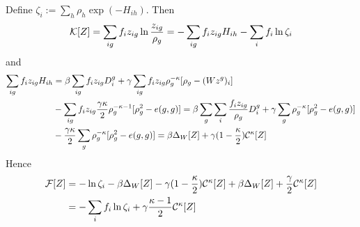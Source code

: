 \documentclass[11pt]{paper}
\begin{document}
Define $\zeta_i:=\sum_h \rho_h \exp(- H_{ih})$. Then 
\begin{equation}
\label{ }
{\cal K}[Z]=\sum_{ig}f_i z_{ig}\ln \frac{z_{ig}}{\rho_g}=-\sum_{ig}f_i z_{ig} H_{ih}-\sum_i f_i\ln \zeta_i
\end{equation}
and
\begin{align}
\label{ }
\sum_{ig}f_i z_{ig} H_{ih}& =\beta\sum_{ig}f_i z_{ig}D_i^g +\gamma\sum_{ig}f_i z_{ig} \rho_g^{-\kappa} [\rho_g-(Wz^g)_i] \notag \\
 & -\sum_{ig}f_i z_{ig}\frac{\gamma\kappa}{2} \rho_g^{-\kappa-1}[\rho_g^2-e(g,g)]=
 \beta\sum_{g}\sum_i \frac{f_i z_{ig}}{\rho_g}D_i^g+\gamma\sum_{g} \rho_g^{-\kappa} [\rho_g^2-e(g,g)] \notag \\ & 
 -\frac{\gamma\kappa}{2} \sum_g\rho_g^{-\kappa}[\rho_g^2-e(g,g)]=\beta\Delta_W[Z]+\gamma(1-\frac{\kappa}{2}){\cal C}^\kappa[Z]
\end{align}
Hence
\begin{align}
\label{fee3}
{\cal F}[Z] &=-\ln \zeta_i -\beta\Delta_W[Z]-\gamma(1-\frac{\kappa}{2}){\cal C}^\kappa[Z]+\beta\Delta_W[Z]+\frac{\gamma}{2} {\cal C}^\kappa[Z]
\notag \\ 
& =-\sum_i f_i\ln \zeta_i +\gamma\frac{\kappa-1}{2}{\cal C}^\kappa[Z]
\end{align}
\end{document}

